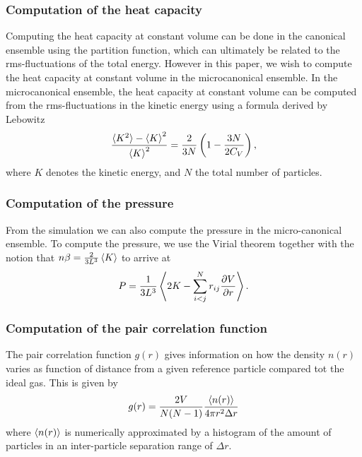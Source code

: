 \documentclass[twoside]{article}
\begin{document}
\subsubsection*{Computation of the heat capacity}
Computing the heat capacity at constant volume can be done in the canonical ensemble using the partition function, which can ultimately be related to the rms-fluctuations of the total energy. However in this paper, we wish to compute the heat capacity at constant volume in the microcanonical ensemble. In the microcanonical ensemble, the heat capacity at constant volume can be computed from the rms-fluctuations in the kinetic energy using a formula derived by Lebowitz\cite{ref_Lebowitz} 
\begin{equation}
\frac{\braket{K^2} - \braket{K}^2}{\braket{K}^2} = \frac{2}{3N} \left( 1 - \frac{3N}{2C_V} \right),
\label{eq_Lebowitz}
\end{equation}
where $K$ denotes the kinetic energy, and $N$ the total number of particles. 
\subsubsection* {Computation of the pressure}
From the simulation we can also compute the pressure in the micro-canonical ensemble. To compute the pressure, we use the Virial theorem together with the notion that $n\beta = \frac{2}{3L^3} \braket{K}$ to arrive at\cite{ref_Thijssen}
\begin{equation}
P = \frac{1}{3L^3} \Braket{2K - \sum_{i<j}^N r_{ij} \frac{\partial V}{\partial r}}.
\label{eq_pressure_virial}
\end{equation}
\subsubsection* {Computation of the pair correlation function}
The pair correlation function $g(r)$  gives information on how the density $n(r)$ varies as function of distance from a given reference particle compared tot the ideal gas. This is given by\cite{ref_Thijssen}
\begin{equation}\label{eq_correlation}
g(r) = \frac{2V}{N(N-1)}\frac{\braket{n(r)}}{4\pi r^2 \Delta r}
\end{equation}
where $\braket{n(r)}$ is numerically approximated by a histogram of the amount of particles in an inter-particle separation range of $\Delta r$. 
\end{document}
